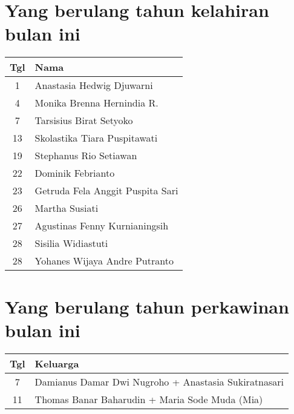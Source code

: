 
\section*{Yang berulang tahun kelahiran bulan ini}


\begin{longtable}{|c|l|} 
\hline Tgl & Nama \\ \hline
1 &	Anastasia Hedwig Djuwarni\\
4 &	Monika Brenna Hernindia R.\\
7 &	Tarsisius Birat Setyoko\\
13& 	Skolastika Tiara Puspitawati\\
19& 	Stephanus Rio Setiawan\\
22& 	Dominik Febrianto\\
23& 	Getruda Fela Anggit Puspita Sari\\
26& 	Martha Susiati\\
27& 	Agustinas Fenny Kurnianingsih\\
28& 	Sisilia Widiastuti\\
28& 	Yohanes Wijaya Andre Putranto\\ \hline
 \end{longtable}
 
\section*{Yang berulang tahun perkawinan  bulan ini}


 \begin{longtable}{|c|l|} 
\hline Tgl & Keluarga \\ \hline
7 & Damianus Damar Dwi Nugroho + Anastasia Sukiratnasari \\ 
11 & Thomas Banar Baharudin + Maria Sode Muda (Mia)\\ \hline 
 \end{longtable}
